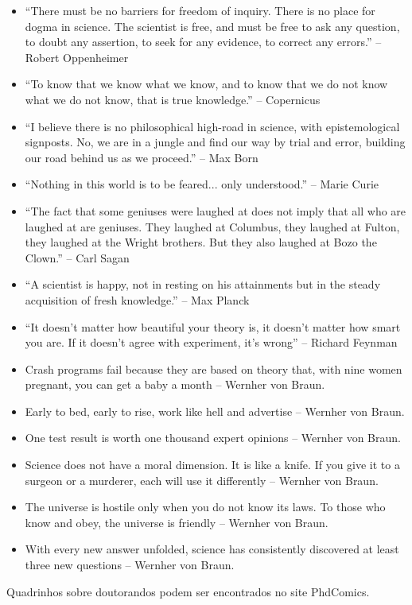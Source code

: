 \begin{itemize}
\item ``There must be no barriers for freedom of inquiry. There is no place for dogma in science. The scientist is free, and must be free to ask any question, to doubt any assertion, to seek for any evidence, to correct any errors.'' -- Robert Oppenheimer
\item ``To know that we know what we know, and to know that we do not know what we do not know, that is true knowledge.'' -- Copernicus
\item ``I believe there is no philosophical high-road in science, with epistemological signposts. No, we are in a jungle and find our way by trial and error, building our road behind us as we proceed.'' -- Max Born
\item ``Nothing in this world is to be feared... only understood.'' -- Marie Curie
\item ``The fact that some geniuses were laughed at does not imply that all who are laughed at are geniuses. They laughed at Columbus, they laughed at Fulton, they laughed at the Wright brothers. But they also laughed at Bozo the Clown.'' -- Carl Sagan
\item	“A scientist is happy, not in resting on his attainments but in the steady acquisition of fresh knowledge.'' -- Max Planck
\item ``It doesn't matter how beautiful your theory is, it doesn't matter how smart you are. If it doesn't agree with experiment, it's wrong'' -- Richard Feynman
\item	Crash programs fail because they are based on theory that, with nine women pregnant, you can get a baby a month -- Wernher von Braun.
\item	Early to bed, early to rise, work like hell and advertise -- Wernher von Braun.
\item	One test result is worth one thousand expert opinions -- Wernher von Braun.
\item	Science does not have a moral dimension. It is like a knife. If you give it to a surgeon or a murderer, each will use it differently -- Wernher von Braun.
\item	The universe is hostile only when you do not know its laws. To those who know and obey, the universe is friendly -- Wernher von Braun.
\item	With every new answer unfolded, science has consistently discovered at least three new questions -- Wernher von Braun.
\end{itemize}


Quadrinhos sobre doutorandos podem ser encontrados no site PhdComics.

